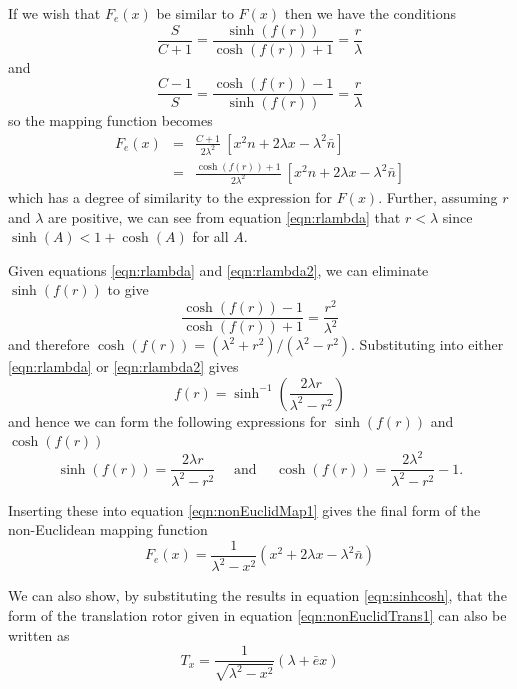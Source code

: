 If we wish that $F_e(x)$ be similar to $F(x)$ then we have the conditions
\begin{equation}
\frac{S}{C + 1} = \frac{\sinh(f(r))}{\cosh(f(r)) + 1} = \frac{r}{\lambda}
\label{eqn:rlambda}
\end{equation}
and
\begin{equation}
\frac{C-1}{S} = \frac{\cosh(f(r)) - 1}{\sinh(f(r))} = \frac{r}{\lambda}
\label{eqn:rlambda2}
\end{equation}
so the mapping function becomes
\begin{eqnarray}
F_e(x) &=& \frac{C+1}{2\lambda^2}\ [x^2n + 2\lambda x - \lambda^2 \bar{n}] \\
&=& \frac{\cosh(f(r)) + 1}{2\lambda^2}\ [x^2n + 2\lambda x - \lambda^2 \bar{n}]
\end{eqnarray}
which has a degree of similarity to the expression for $F(x)$. Further, 
assuming $r$ and $\lambda$ are positive, we can see from equation
\ref{eqn:rlambda} that $r < \lambda$ since $\sinh(A) < 1 + \cosh(A)$
for all $A$.

Given equations \ref{eqn:rlambda} and \ref{eqn:rlambda2}, we can eliminate
$\sinh(f(r))$ to give
\begin{equation}
\frac{\cosh(f(r)) -1}{\cosh(f(r)) + 1} = \frac{r^2}{\lambda^2}
\end{equation}
and therefore $\cosh(f(r)) = (\lambda^2 + r^2)/(\lambda^2 - r^2)$. Substituting
into either \ref{eqn:rlambda} or \ref{eqn:rlambda2} gives
\begin{equation}
f(r) = \sinh^{-1}\left( \frac{2\lambda r}{\lambda^2 - r^2} \right)
\end{equation}
and hence we can form the following expressions for 
$\sinh(f(r))$ and $\cosh(f(r))$
\begin{equation}
\sinh(f(r)) = \frac{2\lambda r}{\lambda^2 - r^2} \quad \mbox{ and } \quad
\cosh(f(r)) = \frac{2\lambda^2}{\lambda^2 - r^2} - 1.
\label{eqn:sinhcosh}
\end{equation}

Inserting these into equation \ref{eqn:nonEuclidMap1} gives the final form
of the non-Euclidean mapping function
\begin{equation}
F_e(x) = \frac{1}{\lambda^2 - x^2}(x^2 + 2\lambda x - \lambda^2\bar{n})
\label{eqn:nonEuclidMapping}
\end{equation}

We can also show, by substituting the results in equation \ref{eqn:sinhcosh}, 
that the form of the translation rotor given in 
equation \ref{eqn:nonEuclidTrans1} can also be written as
\begin{equation}
T_x = \frac{1}{\sqrt{\lambda^2 - x^2}}(\lambda + \bar{e}x)
\label{eqn:transrotor}
\end{equation}

